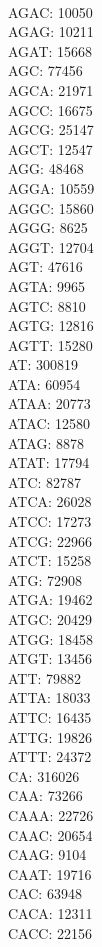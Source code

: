 \begin{multicols}{7}
\\ AGAC:	10050
\\ AGAG:	10211
\\ AGAT:	15668
\\ AGC:	77456
\\ AGCA:	21971
\\ AGCC:	16675
\\ AGCG:	25147
\\ AGCT:	12547
\\ AGG:	48468
\\ AGGA:	10559
\\ AGGC:	15860
\\ AGGG:	8625
\\ AGGT:	12704
\\ AGT:	47616
\\ AGTA:	9965
\\ AGTC:	8810
\\ AGTG:	12816
\\ AGTT:	15280
\\ AT:	300819
\\ ATA:	60954
\\ ATAA:	20773
\\ ATAC:	12580
\\ ATAG:	8878
\\ ATAT:	17794
\\ ATC:	82787
\\ ATCA:	26028
\\ ATCC:	17273
\\ ATCG:	22966
\\ ATCT:	15258
\\ ATG:	72908
\\ ATGA:	19462
\\ ATGC:	20429
\\ ATGG:	18458
\\ ATGT:	13456
\\ ATT:	79882
\\ ATTA:	18033
\\ ATTC:	16435
\\ ATTG:	19826
\\ ATTT:	24372
\\ CA:	316026
\\ CAA:	73266
\\ CAAA:	22726
\\ CAAC:	20654
\\ CAAG:	9104
\\ CAAT:	19716
\\ CAC:	63948
\\ CACA:	12311
\\ CACC:	22156

\end{multicols}
